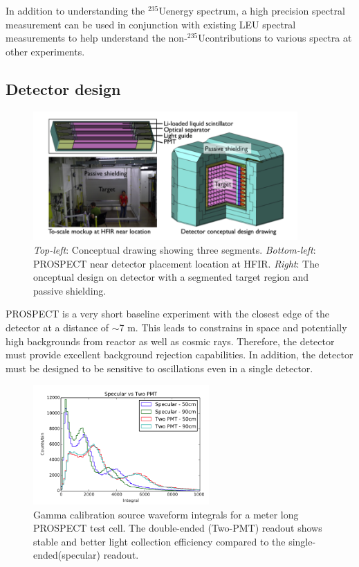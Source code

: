 \documentclass[11pt]{article}
\newcommand{\Ur}{\ensuremath{^{235} \textrm{U} }\hspace{1pt}}
\numberwithin{equation}{section}
\begin{document}
In addition to understanding the \Ur energy spectrum, a high precision spectral measurement can be used in conjunction with existing LEU spectral measurements to help understand the non-\Ur contributions to various spectra at other experiments.


\subsection[Detector design]{Detector design}
 \begin{figure}[h]
\centering
\includegraphics*[width=0.9\textwidth]{./Detector.PNG}
\caption[PROSPECT detector]{\textit{Top-left}: Conceptual drawing showing three segments. \textit{Bottom-left}: PROSPECT near detector placement location at HFIR. \textit{Right}: The onceptual design on detector with a segmented target region and passive shielding.}
\label{fig:detector}
\end{figure}

PROSPECT is a very short baseline experiment with the closest edge of the detector at a distance of $\sim$7 m. This leads to constrains in space and potentially high backgrounds from reactor as well as cosmic rays. Therefore, the detector must provide excellent background rejection capabilities. In addition, the detector must be designed to be sensitive to oscillations even in a single detector.

 \begin{figure}[h]
\centering
\includegraphics*[width=0.6\textwidth]{./doublePMT.PNG}
\caption[PROSPECT light collection efficiency]{Gamma calibration source waveform integrals for a meter long PROSPECT test cell. The double-ended (Two-PMT) readout shows stable and better light collection efficiency compared to the single-ended(specular) readout.}
\label{fig:doublePMT}
\end{figure}
\end{document}
